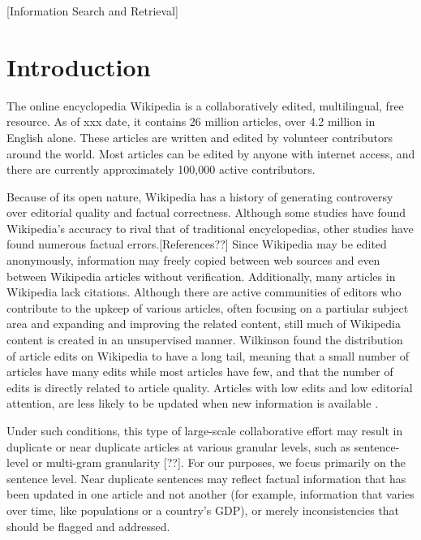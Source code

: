 \documentclass{acm_proc_article-sp}
\begin{document}
[Information Search and Retrieval]


\section{Introduction}
The online encyclopedia Wikipedia is a collaboratively edited, multilingual, free resource. As of xxx date, it contains 26 million articles, over 4.2 million in English alone. These articles are written and edited by volunteer contributors around the world. Most articles can be edited by anyone with internet access, and there are currently approximately 100,000 active contributors.

Because of its open nature, Wikipedia has a history of generating controversy over editorial quality and factual correctness. Although some studies have found Wikipedia's accuracy to rival that of traditional encyclopedias, other studies have found numerous factual errors.[References??] Since Wikipedia may be edited anonymously, information may freely copied between web sources and even between Wikipedia articles without verification. Additionally, many articles in Wikipedia lack citations. Although there are active communities of editors who contribute to the upkeep of various articles, often focusing on a partiular subject area and expanding and improving the related content, still much of Wikipedia content is created in an unsupervised manner. Wilkinson found the distribution of article edits on Wikipedia to have a long tail, meaning that a small number of articles have many edits while most articles have few, and that the number of edits is directly related to article quality. Articles with low edits and low editorial attention, are less likely to be updated when new information is available \cite{wilkinson:wiki}.

Under such conditions, this type of large-scale collaborative effort may result in duplicate or near duplicate articles at various granular levels, such as sentence-level or multi-gram granularity \cite{wiki:weblink} [??]. For our purposes, we focus primarily on the sentence level. Near duplicate sentences may reflect factual information that has been updated in one article and not another (for example, information that varies over time, like populations or a country's GDP), or merely inconsistencies that should be flagged and addressed. 
\end{document}
